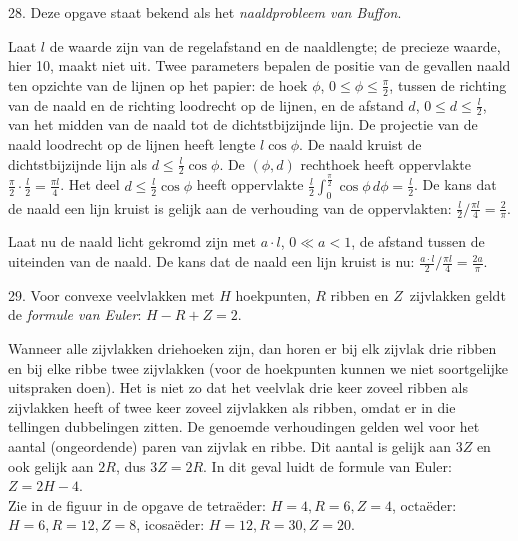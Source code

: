\clearpage

\begin{problem}{28.}
    Deze opgave staat bekend als het \textit{naaldprobleem van Buffon}.

    Laat $l$ de waarde zijn van de regelafstand en de naaldlengte; de precieze waarde, hier 10, maakt niet uit. Twee parameters bepalen de positie van de gevallen naald ten opzichte van de lijnen op het papier: de hoek $\phi$, $0 \leq \phi \leq \frac{\pi}{2}$, tussen de richting van de naald en de richting loodrecht op de lijnen, en de afstand $d$, $0 \leq d \leq \frac{l}{2}$, van het midden van de naald tot de dichtstbijzijnde lijn. De projectie van de naald loodrecht op de lijnen heeft lengte $l \cos \phi$. De naald kruist de dichtstbijzijnde lijn als $d \leq \frac{l}{2} \cos \phi$. De $(\phi,d)$ rechthoek heeft oppervlakte $\frac{\pi}{2} \cdot \frac{l}{2} = \frac{\pi l}{4}$. Het deel $d \leq \frac{l}{2} \cos \phi$ heeft oppervlakte $\frac{l}{2} \int_{0}^{\frac{\pi}{2}} \cos \phi \,d \phi = \frac{l}{2}$. De kans dat de naald een lijn kruist is gelijk aan de verhouding van de oppervlakten: $\frac{l}{2} / \frac{\pi l}{4} = \frac{2}{\pi}$.

    Laat nu de naald licht gekromd zijn met $a \cdot l$, $0 \ll a < 1$, de afstand tussen de uiteinden van de naald. De kans dat de naald een lijn kruist is nu: $\frac{a \cdot l}{2} / \frac{\pi l}{4} = \frac{2 a}{\pi}$.
\end{problem}

\begin{problem}{29.}
    Voor convexe veelvlakken met $H$ hoekpunten, $R$ ribben en $Z$~zij\-vlakken geldt de \textit{formule van Euler}: $H - R + Z = 2$.

    Wanneer alle zijvlakken driehoeken zijn, dan horen er bij elk zijvlak drie ribben en bij elke ribbe twee zijvlakken (voor de hoekpunten kunnen we niet soortgelijke uitspraken doen). Het is niet zo dat het veelvlak drie keer zoveel ribben als zijvlakken heeft of twee keer zoveel zijvlakken als ribben, omdat er in die tellingen dubbelingen zitten. De genoemde verhoudingen gelden wel voor het aantal (ongeordende) paren van zijvlak en ribbe. Dit aantal is gelijk aan $3 Z$ en ook gelijk aan $2 R$, dus $3 Z = 2 R$. In dit geval luidt de formule van Euler: $Z = 2 H - 4$.\\Zie in de figuur in de opgave de tetraëder: $H = 4,R = 6,Z = 4$, octaëder: $H = 6,R = 12,Z = 8$, icosaëder: $H = 12,R = 30,Z = 20$.
\end{problem}

